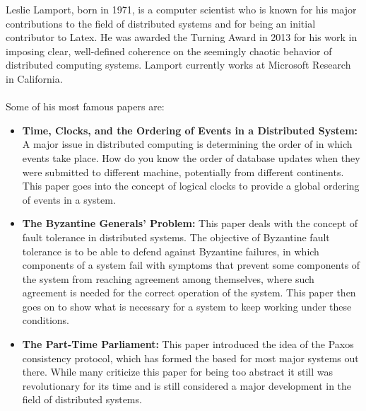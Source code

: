 \documentclass[9pt]{extarticle}
\begin{document}
%
%
\begin{minipage}[t]{.61\linewidth} %
\vspace{-0.4cm}
\hypertarget{firstnews}{}
	
	Leslie Lamport, born in 1971, is a computer scientist who is known
	for his major contributions to the field of distributed systems and
	for being an initial contributor to Latex. He was awarded the Turning
	Award in 2013 for his work in imposing clear, well-defined coherence
	on  the seemingly chaotic behavior of distributed computing systems. 
	Lamport currently works at Microsoft Research in California.\\
	\\
	Some of his most famous papers are:
	\begin{itemize}
	\item \textbf{Time, Clocks, and the Ordering of Events in a 
	Distributed System:} A major issue in distributed computing is 
	determining the order of in which events take place.
	How do you know the order of database updates when they were 
	submitted to different machine, potentially from different 
	continents. This paper goes into the concept of logical clocks
	to provide a global ordering of events in a system.
	\\
	\item \textbf{The Byzantine Generals' Problem:} This paper deals
	with the concept of fault tolerance in distributed systems. The
	objective of Byzantine fault tolerance is to be able to defend 
	against Byzantine failures, in which components of a system fail
	with symptoms that prevent some components of the system from 
	reaching agreement among themselves, where such agreement is needed
	for the correct operation of the system. This paper then goes on
	to show what is necessary for a system to keep working under these
	conditions.
	\\
	\item \textbf{The Part-Time Parliament:}
	This paper introduced the idea of the Paxos consistency protocol, 
	which has formed the based for most major systems out there. While
	many criticize this paper for being too abstract it still was
	revolutionary for its time and is still considered a major development
	in the field of distributed systems.
	\end{itemize}
	

\end{minipage}
\end{document}
